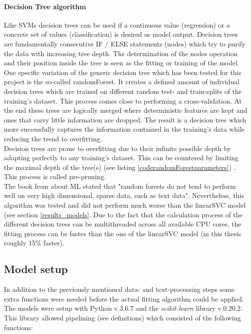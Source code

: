 \paragraph*{Decision Tree algorithm}
Like SVMs decision trees can be used if a continuous value (regression) or a concrete set of values (classification) is desired as model output. Decision trees are fundamentally consecutive IF / ELSE statements (nodes) which try to purify the data with increasing tree depth. The determination of the nodes operation and their position inside the tree is seen as the fitting or training of the model.\\
One specific variation of the generic decision tree which has been tested for this project is the so-called randomForest. It creates a defined amount of individual decision trees which are trained on different random test- and train-splits of the training's dataset. This process comes close to performing a cross-validation. At the end these trees are logically merged where deterministic features are kept and ones that carry little information are dropped. The result is a decision tree which more successfully captures the information contained in the training's data while reducing the trend to overfitting.\\
Decision trees are prone to overfitting due to their infinite possible depth by adapting perfectly to any training's dataset. This can be countered by limiting the maximal depth of the tree(s) (see listing \ref{coderandomForestparameters}) . This process is called pre-pruning.\\
\newline
 The book from \parencite{Guido2016} about ML stated that "random forests do not tend to perform well on very high dimensional, sparse data, such as text data". Nevertheless, this algorithm was tested and did not perform much worse than the linearSVC model (see section \ref{results_models}. Due to the fact that the calculation process of the different decision trees can be multithreaded across all available CPU cores, the fitting process can be faster than the one of the linearSVC model (in this thesis roughly 15\% faster). 

\subsection{Model setup} \label{model_setup}
In addition to the previously mentioned data- and text-processing steps some extra functions were needed before the actual fitting algorithm could be applied. The models were setup with Python v.3.6.7 and the \textit{scikit-learn} library v.0.20.2. This library \parencite{Scikit-learn2018} allowed pipelining (see definitions) which consisted of the following functions:

